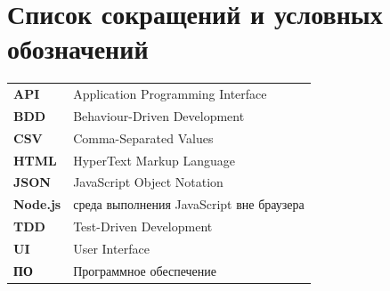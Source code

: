 \chapter*{Список сокращений и условных обозначений}
\noindent
\begin{tabularx}{\textwidth}{>{\bfseries}p{3cm}X}
API & Application Programming Interface \\
BDD & Behaviour-Driven Development \\
CSV & Comma-Separated Values \\
HTML & HyperText Markup Language \\
JSON & JavaScript Object Notation \\
Node.js & среда выполнения JavaScript вне браузера \\
TDD & Test-Driven Development \\
UI & User Interface \\
ПО & Программное обеспечение \\
\end{tabularx}
